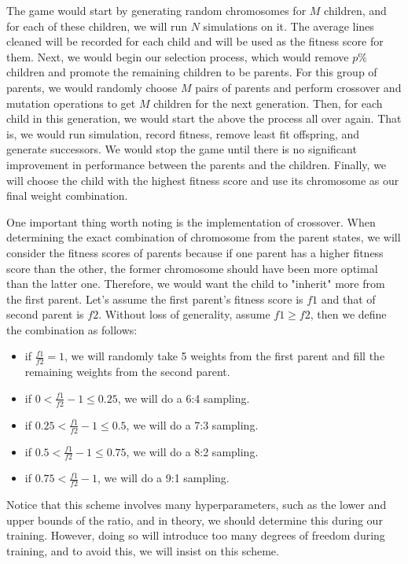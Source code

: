 \documentclass[letterpaper]{article} %
\begin{document}
The game would start by generating random chromosomes for $M$ children, and for each of these children, we will run $N$ simulations on it. The average lines cleaned will be recorded for each child and will be used as the fitness score for them. Next, we would begin our selection process, which would remove $p\%$ children and promote the remaining children to be parents. For this group of parents, we would randomly choose $M$ pairs of parents and perform crossover and mutation operations to get $M$ children for the next generation. Then, for each child in this generation, we would start the above the process all over again. That is, we would run simulation, record fitness, remove least fit offspring, and generate successors. We would stop the game until there is no significant improvement in performance between the parents and the children. Finally, we will choose the child with the highest fitness score and use its chromosome as our final weight combination. 

One important thing worth noting is the implementation of crossover. When determining the exact combination of chromosome from the parent states, we will consider the fitness scores of parents because if one parent has a higher fitness score than the other, the former chromosome should have been more optimal than the latter one. Therefore, we would want the child to "inherit" more from the first parent. Let's assume the first parent's fitness score is $f1$ and that of second parent is $f2$. Without loss of generality, assume $f1 \geq f2$, then we define the combination as follows: 
 
 \begin{itemize}
 \item if $\frac{f1}{f2} = 1$, we will randomly take 5 weights from the first parent and fill the remaining weights from the second parent.
 \item if $0 < \frac{f1}{f2} - 1 \leq 0.25$, we will do a 6:4 sampling.
 \item if $0.25 < \frac{f1}{f2} - 1 \leq  0.5$, we will do a 7:3 sampling.
 \item if $0.5 < \frac{f1}{f2} - 1 \leq  0.75$, we will do a 8:2 sampling.
 \item if $0.75 < \frac{f1}{f2} - 1$, we will do a 9:1 sampling.
 \end{itemize}


 Notice that this scheme involves many hyperparameters, such as the lower and upper bounds of the ratio, and in theory, we should determine this during our training. However, doing so will introduce too many degrees of freedom during training, and to avoid this, we will insist on this scheme.
\end{document}
